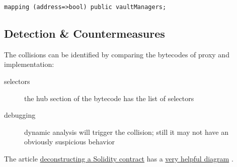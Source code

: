 \begin{lstlisting}[language=Solidity]
mapping (address=>bool) public vaultManagers;
\end{lstlisting}

\subsection{Detection \& Countermeasures}

The collisions can be identified by comparing the bytecodes of proxy and implementation:

\begin{description}
\item[selectors]{the hub section of the bytecode has the list of selectors}
\item[debugging]{dynamic analysis will trigger the collision; still it may not have an obviously suspicious behavior}
\end{description}

The article \href{article-deconstructing-contract}{deconstructing a Solidity contract} \cite{article-deconstructing-contract} has a \href{https://gists.rawgit.com/ajsantander/23c032ec7a722890feed94d93dff574a/raw/a453b28077e9669d5b51f2dc6d93b539a76834b8/BasicToken.svg}{very helpful diagram} \cite{image-deconstruction-diagram}.
